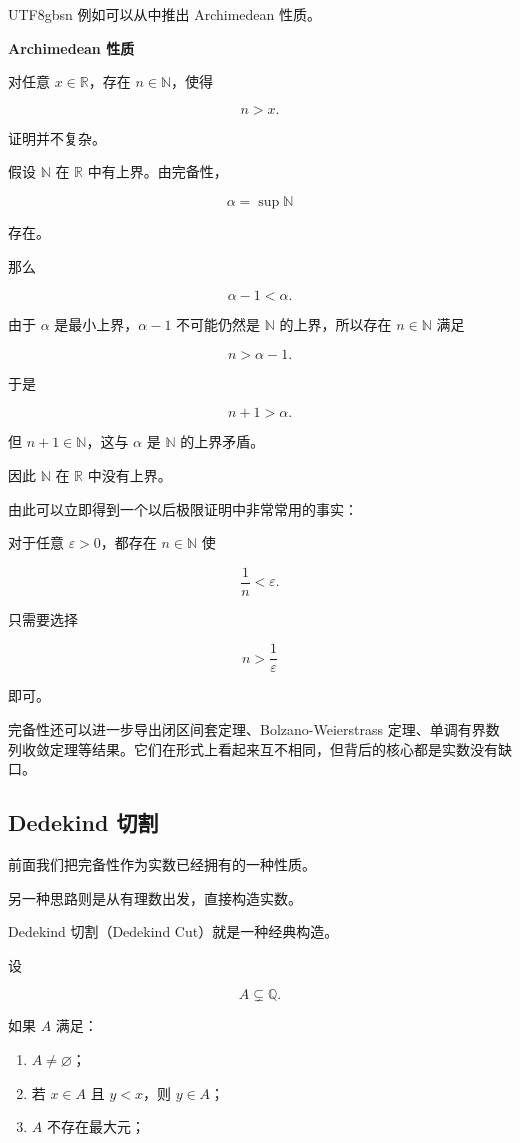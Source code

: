 \documentclass[11pt]{article}
\begin{document}
\begin{CJK*}{UTF8}{gbsn}
例如可以从中推出 Archimedean 性质。

\textbf{Archimedean 性质}

对任意 $x\in\mathbb{R}$，存在 $n\in\mathbb{N}$，使得

\[
n>x.
\]

证明并不复杂。

假设 $\mathbb{N}$ 在 $\mathbb{R}$ 中有上界。由完备性，

\[
\alpha=\sup\mathbb{N}
\]

存在。

那么

\[
\alpha-1<\alpha.
\]

由于 $\alpha$ 是最小上界，$\alpha-1$ 不可能仍然是 $\mathbb{N}$ 的上界，所以存在 $n\in\mathbb{N}$ 满足

\[
n>\alpha-1.
\]

于是

\[
n+1>\alpha.
\]

但 $n+1\in\mathbb{N}$，这与 $\alpha$ 是 $\mathbb{N}$ 的上界矛盾。

因此 $\mathbb{N}$ 在 $\mathbb{R}$ 中没有上界。

由此可以立即得到一个以后极限证明中非常常用的事实：

对于任意 $\varepsilon>0$，都存在 $n\in\mathbb{N}$ 使

\[
\frac{1}{n}<\varepsilon.
\]

只需要选择

\[
n>\frac{1}{\varepsilon}
\]

即可。

完备性还可以进一步导出闭区间套定理、Bolzano-Weierstrass 定理、单调有界数列收敛定理等结果。它们在形式上看起来互不相同，但背后的核心都是实数没有缺口。

\subsection{Dedekind 切割}

前面我们把完备性作为实数已经拥有的一种性质。

另一种思路则是从有理数出发，直接构造实数。

Dedekind 切割（Dedekind Cut）就是一种经典构造。

设

\[
A\subsetneq\mathbb{Q}.
\]

如果 $A$ 满足：

\begin{enumerate}
  \item $A\ne\varnothing$；
  \item 若 $x\in A$ 且 $y<x$，则 $y\in A$；
  \item $A$ 不存在最大元；
\end{enumerate}


\end{CJK*}
\end{document}

